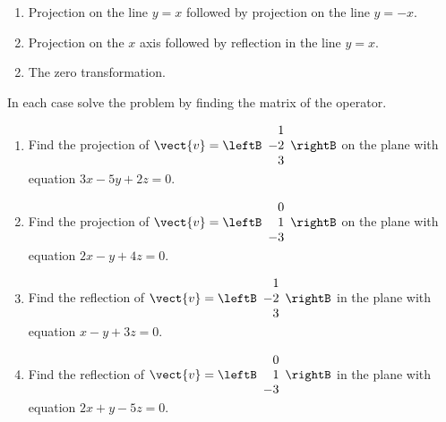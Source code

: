 \begin{multicols}{2}
\begin{ex}
\begin{enumerate}[label={\alph*.}]
\item Projection on the line $y = x$ followed by projection on the line $y = -x$.

\item Projection on the $x$ axis followed by reflection in the line $y = x$.

\end{enumerate}
\begin{sol}
\begin{enumerate}[label={\alph*.}]
\setcounter{enumi}{1}
\item  The zero transformation.

\end{enumerate}
\end{sol}
\end{ex}

\begin{ex}
In each case solve the problem by finding the matrix of the operator.


\begin{enumerate}[label={\alph*.}]
\item Find the projection of 
$\vect{v} = \leftB
\begin{array}{r}
1\\
-2\\
3 
\end{array}
\rightB$
 on the plane with equation $3x - 5y + 2z = 0$.

\item Find the projection of 
$\vect{v} = \leftB
\begin{array}{r}
0\\
1\\
-3 
\end{array}
\rightB$
 on the plane with equation $2x - y + 4z = 0$.

\item Find the reflection of 
$\vect{v} = \leftB
\begin{array}{r}
1\\
-2\\
3 
\end{array}
\rightB$
 in the plane with equation $x - y + 3z = 0$.

\item Find the reflection of 
$\vect{v} = \leftB
\begin{array}{r}
0\\
1\\
-3 
\end{array}
\rightB$
 in the plane with equation $2x + y -5z = 0$.


\end{enumerate}
\end{ex}
\end{multicols}
